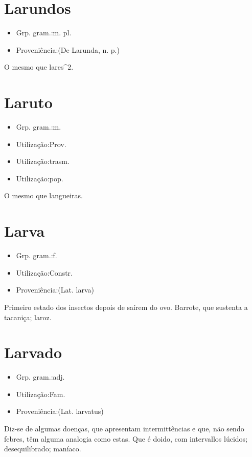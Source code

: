 \section{Larundos}
\begin{itemize}
\item {Grp. gram.:m. pl.}
\end{itemize}
\begin{itemize}
\item {Proveniência:(De \textunderscore Larunda\textunderscore , n. p.)}
\end{itemize}
O mesmo que \textunderscore lares\textunderscore ^2.
\section{Laruto}
\begin{itemize}
\item {Grp. gram.:m.}
\end{itemize}
\begin{itemize}
\item {Utilização:Prov.}
\end{itemize}
\begin{itemize}
\item {Utilização:trasm.}
\end{itemize}
\begin{itemize}
\item {Utilização:pop.}
\end{itemize}
O mesmo que \textunderscore langueiras\textunderscore .
\section{Larva}
\begin{itemize}
\item {Grp. gram.:f.}
\end{itemize}
\begin{itemize}
\item {Utilização:Constr.}
\end{itemize}
\begin{itemize}
\item {Proveniência:(Lat. \textunderscore larva\textunderscore )}
\end{itemize}
Primeiro estado dos insectos depois de saírem do ovo.
Barrote, que sustenta a tacaniça; laroz.
\section{Larvado}
\begin{itemize}
\item {Grp. gram.:adj.}
\end{itemize}
\begin{itemize}
\item {Utilização:Fam.}
\end{itemize}
\begin{itemize}
\item {Proveniência:(Lat. \textunderscore larvatus\textunderscore )}
\end{itemize}
Diz-se de algumas doenças, que apresentam intermittências e que, não sendo febres, têm alguma analogia como estas.
Que é doido, com intervallos lúcidos; desequilibrado; maníaco.
